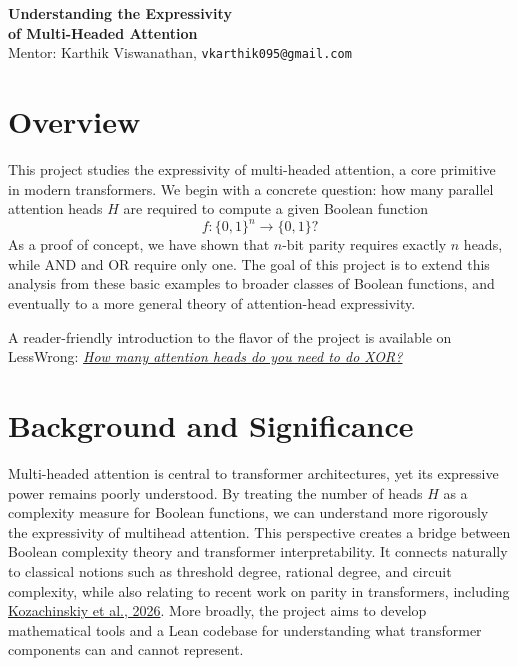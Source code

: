 \documentclass[11pt]{article}
\begin{document}
\begin{center}
  {\LARGE \bfseries Understanding the Expressivity \\
   of Multi-Headed Attention} \\[0.35em]
  {\normalsize Mentor: Karthik Viswanathan, \texttt{vkarthik095@gmail.com}}
\end{center}

\section*{Overview}

This project studies the expressivity of multi-headed attention, a core primitive in modern transformers. We begin with a concrete question: how many parallel attention heads $H$ are required to compute a given Boolean function
\[
f : \{0,1\}^n \to \{0,1\}?
\]
As a proof of concept, we have shown that $n$-bit parity requires exactly $n$ heads, while $\mathrm{AND}$ and $\mathrm{OR}$ require only one. The goal of this project is to extend this analysis from these basic examples to broader classes of Boolean functions, and eventually to a more general theory of attention-head expressivity.

A reader-friendly introduction to the flavor of the project is available on LessWrong:
\href{https://www.lesswrong.com/posts/T66BKwSufh5SfiPHm/how-many-attention-heads-do-you-need-to-do-xor-3}{\textit{How many attention heads do you need to do XOR?}}

\section*{Background and Significance}

Multi-headed attention is central to transformer architectures, yet its expressive power remains poorly understood. By treating the number of heads $H$ as a complexity measure for Boolean functions, we can understand more rigorously the expressivity of multihead attention.  This perspective creates a bridge between Boolean complexity theory and transformer interpretability. It connects naturally to classical notions such as threshold degree, rational degree, and circuit complexity, while also relating to recent work on parity in transformers, including \href{https://arxiv.org/abs/2602.05896}{Kozachinskiy et al., 2026}. More broadly, the project aims to develop mathematical tools and a Lean codebase for understanding what transformer components can and cannot represent.
\end{document}
